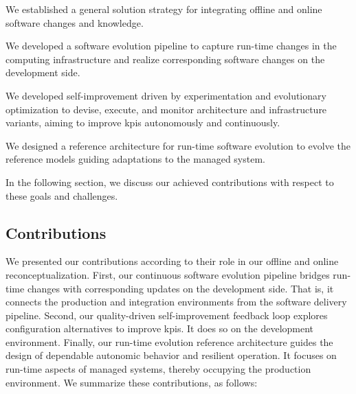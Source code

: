 \begin{description}[leftmargin=3.5em]
	\item[G1:] We established a general solution strategy for integrating offline and online software changes and knowledge. 
	\item[G2:] We developed a software evolution pipeline to capture run-time changes in the computing infrastructure and realize corresponding software changes on the development side.
	\item[G3:] We developed self-improvement driven by experimentation and evolutionary optimization to devise, execute, and monitor architecture and infrastructure variants, aiming to improve \glspl{kpi} autonomously and continuously.
	\item[G4:] We designed a reference architecture for run-time software evolution to evolve the reference models guiding adaptations to the managed system.
\end{description}

In the following section, we discuss our achieved contributions with respect to these goals and challenges.

\subsection{Contributions}
\label{subsect:conclusions--contributions}

We presented our contributions according to their role in our offline and online reconceptualization. First, our continuous software evolution pipeline bridges run-time changes with corresponding updates on the development side. That is, it connects the production and integration environments from the software delivery pipeline. Second, our quality-driven self-improvement feedback loop explores configuration alternatives to improve \glspl{kpi}. It does so on the development environment. Finally, our run-time evolution reference architecture guides the design of dependable autonomic behavior and resilient operation. It focuses on run-time aspects of managed systems, thereby occupying the production environment. We summarize these contributions, as follows:

